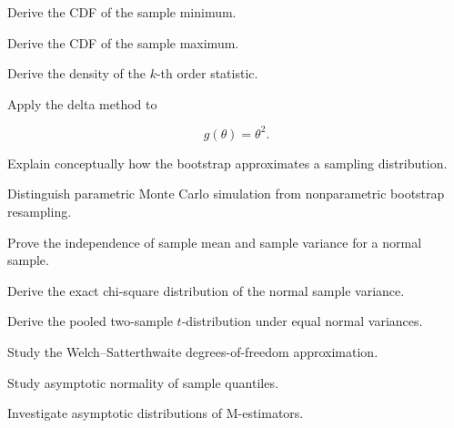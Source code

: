 \begin{exercise}[3]
Derive the CDF of the sample minimum.
\end{exercise}

\begin{exercise}[3]
Derive the CDF of the sample maximum.
\end{exercise}

\begin{exercise}[3]
Derive the density of the \(k\)-th order statistic.
\end{exercise}

\begin{exercise}[3]
Apply the delta method to

\[
g(\theta)=\theta^2.
\]
\end{exercise}

\begin{exercise}[3]
Explain conceptually how the bootstrap approximates a sampling
distribution.
\end{exercise}

\begin{exercise}[3]
Distinguish parametric Monte Carlo simulation from nonparametric
bootstrap resampling.
\end{exercise}

\begin{exercise}[4]
Prove the independence of sample mean and sample variance for a normal
sample.
\end{exercise}

\begin{exercise}[4]
Derive the exact chi-square distribution of the normal sample variance.
\end{exercise}

\begin{exercise}[4]
Derive the pooled two-sample \(t\)-distribution under equal normal
variances.
\end{exercise}

\begin{exercise}[4]
Study the Welch--Satterthwaite degrees-of-freedom approximation.
\end{exercise}

\begin{exercise}[4]
Study asymptotic normality of sample quantiles.
\end{exercise}

\begin{exercise}[4]
Investigate asymptotic distributions of M-estimators.
\end{exercise}

